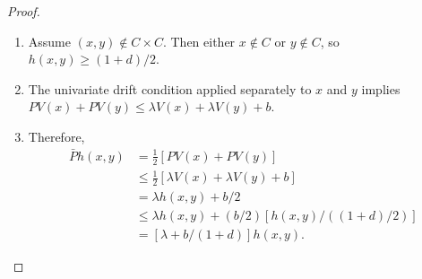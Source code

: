 \documentclass[12pt]{article}
\begin{document}
\begin{proof}
    \begin{enumerate}
        \item
            Assume \( (x,y) \notin C \times C \).  Then either \( x
            \notin C \) or \( y \notin C \), so \( h(x,y) \ge (1 + d)/2 \).
        \item
            The univariate drift condition applied separately to \( x \)
            and \( y \) implies \( PV(x) + PV(y) \le \lambda V(x) +
            \lambda V(y) + b \).
        \item
            Therefore,
            \begin{align*}
                \bar{P}h(x,y) &= \frac{1}{2} \left[ PV(x) + PV(y) \right]
                \\
                &\le \frac{1}{2} \left[ \lambda V(x) + \lambda V(y) + b
                \right] \\
                &= \lambda h(x,y) + b/2 \\
                &\le \lambda h(x,y) + (b/2) \left[ h(x,y)/((1+d)/2)
                \right] \\
                &= \left[ \lambda + b/(1+d) \right] h(x,y).
            \end{align*}
    \end{enumerate}
\end{proof}
\end{document}
